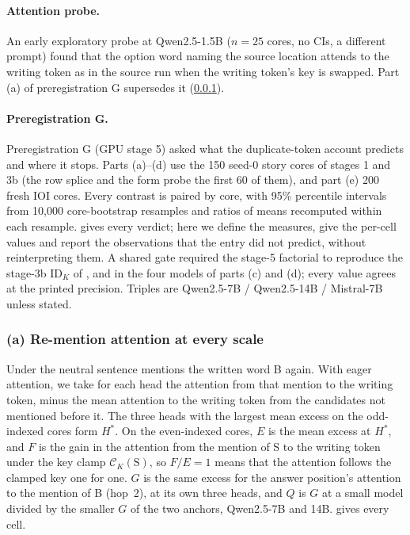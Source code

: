 \paragraph{Attention probe.} An early exploratory probe at Qwen2.5-1.5B ($n = 25$ cores, no CIs, a different prompt) found that the option word naming the source location attends to the writing token as in the source run when the writing token's key is swapped. Part (a) of preregistration G supersedes it (\cref{app:g-attention}).

\paragraph{Preregistration G.} Preregistration G (GPU stage 5) asked what the duplicate-token account predicts and where it stops. Parts (a)--(d) use the 150 seed-0 story cores of stages 1 and 3b (the row splice and the form probe the first 60 of them), and part (e) 200 fresh IOI cores. Every contrast is paired by core, with 95\% percentile intervals from 10{,}000 core-bootstrap resamples and ratios of means recomputed within each resample.  gives every verdict; here we define the measures, give the per-cell values and report the observations that the entry did not predict, without reinterpreting them. A shared gate required the stage-5 factorial to reproduce the stage-3b $\mathrm{ID}_K$ of \fmtPost{}, \fmtNone{} and \fmtListA{} in the four models of parts (c) and (d); every value agrees at the printed precision. Triples are Qwen2.5-7B / Qwen2.5-14B / Mistral-7B unless stated.

\subsubsection{(a) Re-mention attention at every scale}\label{app:g-attention}

Under \fmtPost{} the neutral sentence mentions the written word B again. With eager attention, we take for each head the attention from that mention to the writing token, minus the mean attention to the writing token from the candidates not mentioned before it. The three heads with the largest mean excess on the odd-indexed cores form $H^*$. On the even-indexed cores, $E$ is the mean excess at $H^*$, and $F$ is the gain in the attention from the mention of S to the writing token under the key clamp $\mathcal{C}_K(\mathrm{S})$, so $F/E = 1$ means that the attention follows the clamped key one for one. $G$ is the same excess for the answer position's attention to the mention of B (hop~2), at its own three heads, and $Q$ is $G$ at a small model divided by the smaller $G$ of the two anchors, Qwen2.5-7B and 14B.  gives every cell.

